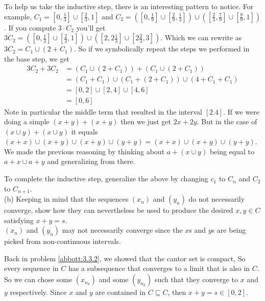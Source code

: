 To help us take the inductive step, there is an interesting pattern to notice.
For example, $C_1 = \left[0, \frac{1}{3}\right] \cup \left[\frac{2}{3}, 1\right]$
and $C_2 = \left( \left[0, \frac{1}{9}\right] \cup \left[\frac{2}{9}, \frac{1}{3}\right] \right) \cup \left( \left[\frac{2}{3}, \frac{7}{9}\right] \cup \left[\frac{8}{9}, 1\right] \right)$.
If you compute $3\cdot C_2$ you'll get
$3C_2 = \left( \left[0, \frac{1}{3}\right] \cup \left[\frac{2}{3}, 1\right] \right) \cup \left( \left[2, 2\frac{1}{3}\right] \cup \left[2\frac{2}{3}, 3\right] \right)$.
Which we can rewrite as $3C_2 = C_1 \cup \left( 2 + C_1 \right)$.
So if we symbolically repeat the steps we performed in the base step, we get
\begin{align*}
3C_2 + 3C_2 &= \left( C_1 \cup \left( 2 + C_1 \right) \right) + \left(C_1 \cup \left( 2 + C_1 \right) \right) \\
    &= \left( C_1 + C_1 \right) \cup \left( C_1 + (2 + C_1) \right) \cup \left(4 + C_1 + C_1 \right) \\
    &= [0,2] \cup [2,4] \cup [4,6] \\
    &= [0,6]
\end{align*}
Note in particular the middle term that resulted in the interval $[2.4]$.
If we were doing a simple $(x+y) + (x+y)$ then we just get $2x + 2y$.
But in the case of $(x \cup y) + (x \cup y)$ it equals $(x+x) \cup (x+y) \cup (x+y) \cup (y+y) = (x+x) \cup (x+y) \cup (y+y)$.
We made the previous reasoning by thinking about $a + (x \cup y)$ being equal to $a+x \cup a+y$ and generalizing from there.

To complete the inductive step, generalize the above by changing $c_1$ to $C_n$ and $C_2$ to $C_{n+1}$.
\\

(b) Keeping in mind that the sequences $(x_n)$ and $(y_n)$ do not necessarily converge,
show how they can nevertheless be used to produce the desired $x,y \in C$ satisfying $x + y = s$.
\\

$(x_n)$ and $(y_n)$ may not necessarily converge since the $x$s and $y$s are being picked from
non-continuous intervals.

Back in problem \ref{abbott:3.3.2}, we showed that the cantor set is compact,
So every sequence in $C$ has a subsequence that converges to a limit that is also in $C$.
So we can chose some $(x_{n_k})$ and some $(y_{n_k})$ such that they converge to $x$ and $y$
respectively. Since $x$ and $y$ are contained in $C \subseteq C$, then $x + y = s \in [0,2]$.

